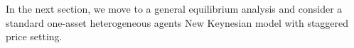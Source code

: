 \documentclass[a4paper,12pt]{article}%
\begin{document}
In the next section, we move to a general equilibrium analysis and consider a standard one-asset heterogeneous agents New Keynesian model with staggered price setting. %
\end{document}
